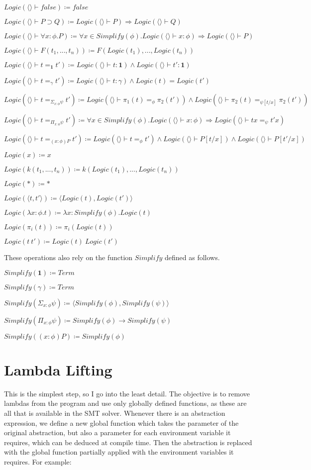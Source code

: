 \documentclass[12pt,a4paper,titlepage]{article}
\newcommand{\lnc}[1]{Logic(\langle \rangle \vdash #1)}
\begin{document}
    $\lnc{false} \coloneqq false$

    $\lnc{P \supset Q} \coloneqq \lnc{P} \Rightarrow \lnc{Q}$

    $\lnc{\forall x: \phi . P} \coloneqq \forall x \in Simplify(\phi) . \lnc{x: \phi} \Rightarrow \lnc{P}$

    $\lnc{F(t_1, ..., t_n)} \coloneqq F(Logic(t_1), ..., Logic(t_n))$

    $\lnc{t =_\textbf{1} t'} \coloneqq \lnc{t: \textbf{1}} \land \lnc{t': \textbf{1}}$

    $\lnc{t =_\gamma t'} \coloneqq \lnc{t: \gamma} \land Logic(t) = Logic(t')$

    $\lnc{t =_{\Sigma_{x: \phi} \psi} t'} \coloneqq
    \lnc{\pi_1 (t) =_\phi \pi_2 (t')} \land \lnc{\pi_2 (t) =_{\psi[t/x]} \pi_2 (t')}$

    $\lnc{t =_{\Pi_{x: \phi} \psi} t'} \coloneqq
    \forall x \in Simplify(\phi) . \lnc{x: \phi} \Rightarrow \lnc{tx =_\psi t'x}$

    $\lnc{t =_{(x: \phi)P} t'} \coloneqq \lnc{t =_\phi t'} \land \lnc{P[t/x]} \land \lnc{P[t'/x]}$

    $Logic(x) \coloneqq x$

    $Logic(k(t_1, ..., t_n)) \coloneqq k(Logic(t_1), ..., Logic(t_n))$

    $Logic(\ast) \coloneqq \ast$

    $Logic(\langle t, t' \rangle) \coloneqq \langle Logic(t), Logic(t') \rangle$

    $Logic(\lambda x: \phi . t) \coloneqq \lambda x: Simplify(\phi) . Logic(t)$

    $Logic(\pi_i (t)) \coloneqq \pi_i (Logic(t))$

    $Logic(t\ t') \coloneqq Logic(t)\ Logic(t')$

    These operations also rely on the function $Simplify$ defined as follows.

    $Simplify(\textbf{1}) \coloneqq Term$

    $Simplify(\gamma) \coloneqq Term$

    $Simplify(\Sigma_{x: \phi} \psi) \coloneqq \langle Simplify(\phi), Simplify(\psi) \rangle$

    $Simplify(\Pi_{x: \phi} \psi) \coloneqq Simplify(\phi) \rightarrow Simplify(\psi)$

    $Simplify((x: \phi)P) \coloneqq Simplify(\phi)$

    \section{Lambda Lifting}
    This is the simplest step, so I go into the least detail.
    The objective is to remove lambdas from the program and use only globally defined functions, as these are all
    that is available in the SMT solver.
    Whenever there is an abstraction expression, we define a new global function which takes the parameter of the
    original abstraction, but also a parameter for each environment variable it requires, which can be deduced at
    compile time.
    Then the abstraction is replaced with the global function partially applied with the environment variables it
    requires. For example:
\end{document}
